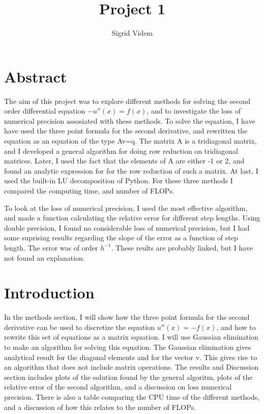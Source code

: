 \documentclass{article}
\author{Sigrid Videm}
\title{Project 1}
\begin{document}
\maketitle
\tableofcontents %

\section{Abstract} 
The aim of this project was to explore different methods for solving the second order differential equation $-u''(x)=f(x)$, and to investigate the loss of numerical precision assosiated with these methods. To solve the equation, I have have used the three point formula for the second derivative, and rewritten the equation as an equation of the type Av=q. The matrix A is a tridiagonal matrix, and I developed a general  algorithm for doing row reduction on tridiagonal matrices. Later, I used the fact that the elements of A are either -1 or 2, and found an analytic expression for for the row reduction of such a matrix. At last, I used the built-in LU decomposition of Python. For these three methods I compared the computing time, and number of FLOPs. 

To look at the loss of numerical precision, I used the most effective algorithm, and made a function calculating the relative error for different step lengths. Using double precision, I found no considerable loss of numerical precision, but I had some suprising results regarding the slope of the error as a function of step length. The error was of order $h^{-1}$. These reults are probably linked, but I have not found an explanation. 
\section{Introduction}
In the methods section, I will show how the three point formula for the second derivative can be used to discretize the equation $u''(x)=-f(x)$, and how to rewrite this set of equations as a matrix equation. I will use Gaussian elimination to make an algorithm for solving this equation. The Gaussian elimination gives analytical result for the diagonal elements and for the vector v. This gives rise to an algorithm that does not include matrix operations. 
The results and Discussion section includes plots of the solution found by the general algoritm, plots of the relative error of the second algorithm, and a discussion on loss numerical precision. There is also a table comparing the CPU time of the different methods, and a discussion of how this relates to the number of FLOPs. 
\end{document}
